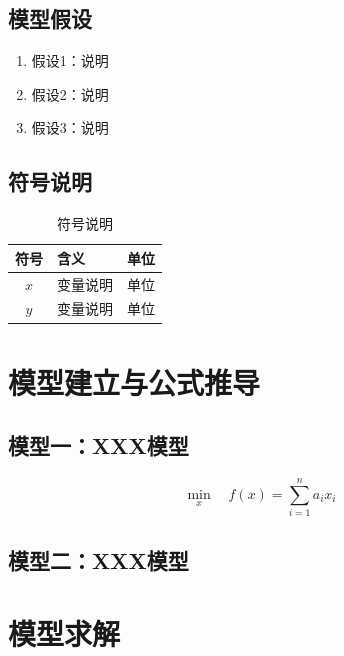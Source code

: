 \subsection{模型假设}
\begin{enumerate}[label=\arabic*.]
  \item 假设1：说明
  \item 假设2：说明
  \item 假设3：说明
\end{enumerate}

\subsection{符号说明}
\begin{table}[H]
  \centering
  \caption{符号说明}
  \begin{tabular}{cll}
    \toprule
    符号 & 含义 & 单位 \\
    \midrule
    $x$ & 变量说明 & 单位 \\
    $y$ & 变量说明 & 单位 \\
    \bottomrule
  \end{tabular}
\end{table}

\section{模型建立与公式推导}

\subsection{模型一：XXX模型}

\begin{equation}
  \min_{x} \quad f(x) = \sum_{i=1}^{n} a_i x_i
  \label{eq:model1}
\end{equation}

\subsection{模型二：XXX模型}

\section{模型求解}


